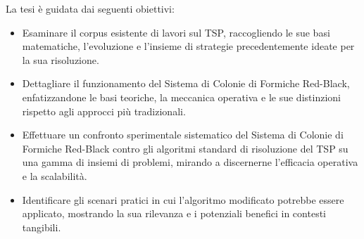 La tesi è guidata dai seguenti obiettivi:

\begin{itemize}
	\item Esaminare il corpus esistente di lavori sul \gls{TSP}, raccogliendo le sue basi matematiche, l'evoluzione e l'insieme di strategie precedentemente ideate per la sua risoluzione.
	\item Dettagliare il funzionamento del Sistema di Colonie di Formiche Red-Black, enfatizzandone le basi teoriche, la meccanica operativa e le sue distinzioni rispetto agli approcci più tradizionali.
	\item Effettuare un confronto sperimentale sistematico del Sistema di Colonie di Formiche Red-Black contro gli algoritmi standard di risoluzione del \gls{TSP} su una gamma di insiemi di problemi, mirando a discernerne l'efficacia operativa e la scalabilità.
	\item Identificare gli scenari pratici in cui l'algoritmo modificato potrebbe essere applicato, mostrando la sua rilevanza e i potenziali benefici in contesti tangibili.
\end{itemize}





